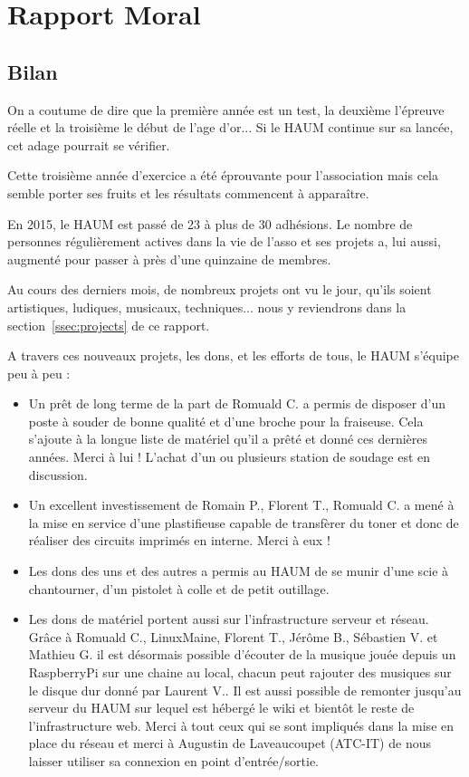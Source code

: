 \documentclass[a4paper, 11pt]{article}
\begin{document}
\section{Rapport Moral}


\subsection{Bilan}

On a coutume de dire que la première année est un test, la deuxième l'épreuve réelle et la troisième le début de l'age
d'or... Si le HAUM continue sur sa lancée, cet adage pourrait se vérifier.

Cette troisième année d'exercice a été éprouvante pour l'association mais cela semble porter ses fruits et les résultats
commencent à apparaître.

En 2015, le HAUM est passé de 23 à plus de 30 adhésions. Le nombre de personnes régulièrement actives dans la vie de l'asso
et ses projets a, lui aussi, augmenté pour passer à près d'une quinzaine de membres.

Au cours des derniers mois, de nombreux projets ont vu le jour, qu'ils soient artistiques, ludiques, musicaux,
techniques... nous y reviendrons dans la section~\ref{ssec:projects} de ce rapport.

A travers ces nouveaux projets, les dons, et les efforts de tous, le HAUM s'équipe peu à peu :

\begin{itemize}
	\item Un prêt de long terme de la part de Romuald C. a permis de disposer d'un poste à souder de bonne qualité et
		d'une broche pour la fraiseuse. Cela s'ajoute à la longue liste de matériel qu'il a prêté et donné ces dernières
		années. Merci à lui ! L'achat d'un ou plusieurs station de soudage est en discussion.
	\item Un excellent investissement de Romain P., Florent T., Romuald C. a mené à la mise en service d'une plastifieuse
		capable de transfèrer du toner et donc de réaliser des circuits imprimés en interne. Merci à eux !
	\item Les dons des uns et des autres a permis au HAUM de se munir d'une scie à chantourner, d'un pistolet à colle et
		de petit outillage.
	\item Les dons de matériel portent aussi sur l'infrastructure serveur et réseau. Grâce à Romuald C., LinuxMaine,
		Florent T., Jérôme B., Sébastien V. et Mathieu G. il est désormais possible d'écouter de la musique jouée depuis un
		RaspberryPi sur une chaine au local, chacun peut rajouter des musiques sur le disque dur donné par Laurent
		V.. Il est aussi possible de remonter jusqu'au serveur du HAUM sur lequel est hébergé le wiki et bientôt le
		reste de l'infrastructure web. Merci à tout ceux qui se sont impliqués dans la mise en place du réseau et merci
		à Augustin de Laveaucoupet (ATC-IT) de nous laisser utiliser sa connexion en point d'entrée/sortie.
\end{itemize}
\end{document}
